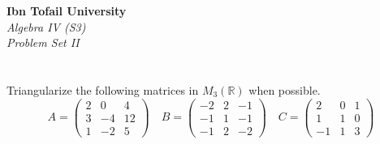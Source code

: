 \documentclass[12pt]{article}
\begin{document}
\begin{center}
\Large\textbf{Ibn Tofail University} \\[1em]
\large\textit{Algebra IV (S3)} \\[2em]
\large\textit{Problem Set II} \\[0.5em]
\end{center}

\vspace{1cm}

\section{}
Triangularize the following matrices in $M_{3}(\mathbb{R})$ when possible.
$$A=\begin{pmatrix}2&0&4\\ 3&-4&12\\ 1&-2&5\end{pmatrix} \quad B=\begin{pmatrix}-2&2&-1\\ -1&1&-1\\ -1&2&-2\end{pmatrix} \quad C=\begin{pmatrix}2&0&1\\ 1&1&0\\ -1&1&3\end{pmatrix}$$
\end{document}
